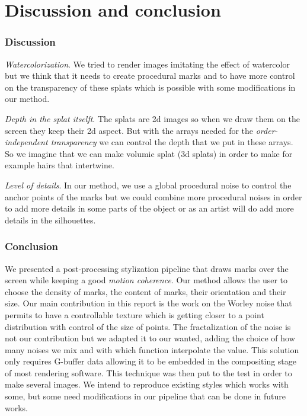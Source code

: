 \chapter{Discussion and conclusion}

\subsection{Discussion}

\textit{Watercolorization}. We tried to render images imitating the effect of watercolor but we think that it needs to create procedural marks and to have more control on the transparency of these splats which is possible with some modifications in our method. \newline

\textit{Depth in the splat itselft}. The splats are 2d images so when we draw them on the screen they keep their 2d aspect. But with the arrays needed for the \textit{order-independent transparency} we can control the depth that we put in these arrays. So we imagine that we can make volumic splat (3d splats) in order to make for example hairs that intertwine. \newline

\textit{Level of details}. In our method, we use a global procedural noise to control the anchor points of the marks but we could combine more procedural noises in order to add more details in some parts of the object or as an artist will do add more details in the silhouettes. \newline

\subsection{Conclusion}

We presented a post-processing stylization pipeline that draws marks over the screen while keeping a good \textit{motion coherence}. Our method allows the user to choose the density of marks, the content of marks, their orientation and their size. Our main contribution in this report is the work on the Worley noise that permits to have a controllable texture which is getting closer to a point distribution with control of the size of points. The fractalization of the noise is not our contribution but we adapted it to our wanted, adding the choice of how many noises we mix and with which function interpolate the value. This solution only requires G-buffer data allowing it to be embedded in the compositing stage of most rendering software. This technique was then put to the test in order to make several images. We intend to reproduce existing styles which works with some, but some need modifications in our pipeline that can be done in future works.
